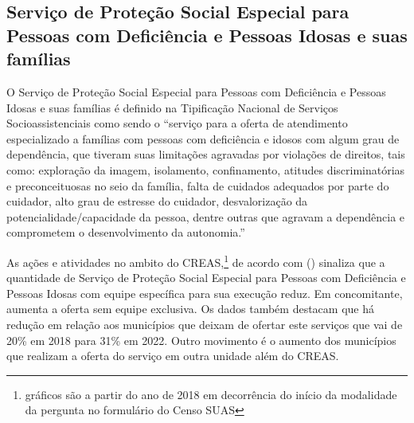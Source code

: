\documentclass[
  brazilian]{report}
\begin{document}
\hypertarget{serviuxe7o-de-proteuxe7uxe3o-social-especial-para-pessoas-com-deficiuxeancia-e-pessoas-idosas-e-suas-famuxedlias}{%
\subsection{Serviço de Proteção Social Especial para Pessoas com
Deficiência e Pessoas Idosas e suas
famílias}\label{serviuxe7o-de-proteuxe7uxe3o-social-especial-para-pessoas-com-deficiuxeancia-e-pessoas-idosas-e-suas-famuxedlias}}

O Serviço de Proteção Social Especial para Pessoas com Deficiência e
Pessoas Idosas e suas famílias é definido na Tipificação Nacional de
Serviços Socioassistenciais como sendo o ``serviço para a oferta de
atendimento especializado a famílias com pessoas com deficiência e
idosos com algum grau de dependência, que tiveram suas limitações
agravadas por violações de direitos, tais como: exploração da imagem,
isolamento, confinamento, atitudes discriminatórias e preconceituosas no
seio da família, falta de cuidados adequados por parte do cuidador, alto
grau de estresse do cuidador, desvalorização da
potencialidade/capacidade da pessoa, dentre outras que agravam a
dependência e comprometem o desenvolvimento da autonomia.''

As ações e atividades no ambito do
CREAS,\footnote{gráficos são a partir do ano de 2018 em decorrência do início da modalidade da pergunta no formulário do Censo SUAS}
de acordo com () sinaliza que a quantidade
de Serviço de Proteção Social Especial para Pessoas com Deficiência e
Pessoas Idosas com equipe específica para sua execução reduz. Em
concomitante, aumenta a oferta sem equipe exclusiva. Os dados também
destacam que há redução em relação aos municípios que deixam de ofertar
este serviços que vai de 20\% em 2018 para 31\% em 2022. Outro movimento
é o aumento dos municípios que realizam a oferta do serviço em outra
unidade além do CREAS.
\end{document}
